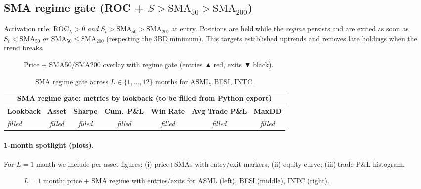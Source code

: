 \documentclass[12pt,a4paper]{report}
\begin{document}
\subsection{SMA regime gate (ROC + $S>\mathrm{SMA}_{50}>\mathrm{SMA}_{200}$)}
Activation rule: $\mathrm{ROC}_{L}>0$ \emph{and} $S_t>\mathrm{SMA}_{50}>\mathrm{SMA}_{200}$ at entry.
Positions are held while the \emph{regime} persists and are exited as soon as
\mbox{$S_t<\mathrm{SMA}_{50}$} \emph{or} \mbox{$\mathrm{SMA}_{50}\le \mathrm{SMA}_{200}$}
(respecting the 3BD minimum). This targets established uptrends and removes
late holdings when the trend breaks.

\begin{figure}[h]
\centering
\fbox{\rule{0pt}{2.1in}\rule{.95\linewidth}{0pt}}
\caption{Price + SMA50/SMA200 overlay with regime gate (entries ▲ red, exits ▼ black).}
\label{fig:mombull_sma_overlay}
\end{figure}

\begin{table}[h]
\centering
\small
\begin{tabular}{lcccccc}
\toprule
\multicolumn{7}{c}{\textbf{SMA regime gate: metrics by lookback} (to be filled from Python export)}\\
\midrule
\textbf{Lookback} & \textbf{Asset} & \textbf{Sharpe} & \textbf{Cum.\ P\&L} & \textbf{Win Rate} & \textbf{Avg Trade P\&L} & \textbf{MaxDD} \\
\midrule
\emph{filled} & \emph{filled} & \emph{filled} & \emph{filled} & \emph{filled} & \emph{filled} & \emph{filled} \\
\bottomrule
\end{tabular}
\caption{SMA regime gate across $L\in\{1,\dots,12\}$ months for ASML, BESI, INTC.}
\label{tab:mombull_sma_metrics}
\end{table}

\paragraph{1-month spotlight (plots).}
For $L=1$ month we include per-asset figures:
(i) price+SMAs with entry/exit markers; (ii) equity curve; (iii) trade P\&L histogram.
\begin{figure}[h]
\centering
\fbox{\rule{0pt}{1.65in}\rule{.32\linewidth}{0pt}}\hfill
\fbox{\rule{0pt}{1.65in}\rule{.32\linewidth}{0pt}}\hfill
\fbox{\rule{0pt}{1.65in}\rule{.32\linewidth}{0pt}}
\caption{$L=1$ month: price + SMA regime with entries/exits for ASML (left), BESI (middle), INTC (right).}
\label{fig:mombull_L1_price_sma}
\end{figure}
\end{document}
